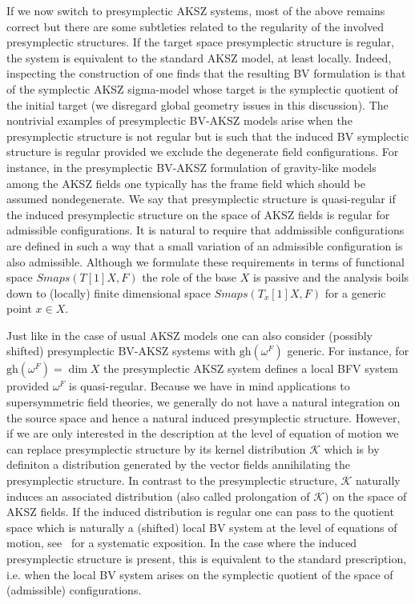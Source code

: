 \documentclass[a4paper,12pt]{article}
\numberwithin{equation}{section} %
\newcommand{\gh}[1]{\mathrm{gh}(#1)}
\def\cK{\mathcal{K}}
\numberwithin{equation}{section}
\begin{document}
If we now switch to presymplectic AKSZ systems, most of the above remains correct but there are some subtleties related to the regularity of the involved presymplectic structures. If the target space presymplectic structure is regular, the system is equivalent to the standard AKSZ model, at least locally. Indeed, inspecting the construction of \cite{Grigoriev:2022zlq,Dneprov:2024cvt} one finds that the resulting BV formulation is that of the symplectic AKSZ sigma-model whose target is the symplectic quotient of the initial target (we disregard global geometry issues in this discussion). The nontrivial examples of presymplectic BV-AKSZ models arise when the presymplectic structure is not regular but is such that the induced BV symplectic structure is regular provided we exclude the degenerate field configurations. For instance, in the presymplectic BV-AKSZ formulation of gravity-like models~\cite{Grigoriev:2020xec,Dneprov:2022jyn,Dneprov:2024cvt} among the AKSZ fields one typically has the frame field which should be assumed nondegenerate. We say that presymplectic structure is quasi-regular if the induced presymplectic structure on the space of AKSZ fields is regular for admissible configurations. It is natural to require that addmissible configurations are defined in such a way that a small variation of an admissible configuration is also admissible. Although we formulate these requirements in terms of functional space $Smaps(T[1]X,F)$ the role of the base $X$ is passive and the analysis boils down to (locally) finite dimensional space $Smaps(T_x[1] X,F)$ for a generic point $x\in X$.


Just like in the case of usual AKSZ models one can also consider (possibly shifted) presymplectic BV-AKSZ systems with $\gh{\omega^F}$ generic. For instance, for $\gh{\omega^F}=\dim{X}$ the presymplectic AKSZ system defines a local BFV system provided $\omega^F$ is quasi-regular. Because we have in mind applications to supersymmetric field theories, we generally do not have a natural integration on the source space and hence a natural induced  presymplectic structure. However, if we are only interested in the description at the level of equation of motion we can replace presymplectic structure by its kernel distribution $\cK$ which is by definiton a distribution generated by the vector fields annihilating the presymplectic structure. In contrast to the presymplectic  structure, $\cK$ naturally induces an associated distribution (also called prolongation of $\cK$) on the space of AKSZ fields. If the induced distribution is regular one can pass to the quotient space which is naturally a (shifted) local BV system at the level of equations of motion, see~\cite{Grigoriev:2024ncm} for a systematic exposition. In the case where the induced presymplectic structure is present, this is equivalent to the standard prescription, i.e. when the local BV system arises on the symplectic quotient of the space of (admissible) configurations.   
\end{document}
